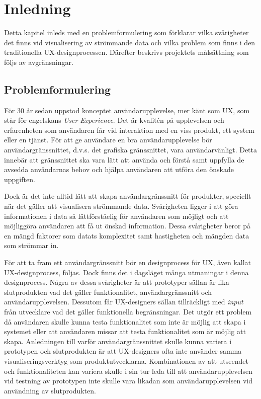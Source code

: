 \documentclass[12pt]{kththesis}
\begin{document}
\afterpage{\null\newpage}

\renewcommand{\contentsname}{Innehållsförteckning}

\tableofcontents


\mainmatter

\afterpage{\null}


\chapter{Inledning}
Detta kapitel inleds med en problemformulering som förklarar vilka svårigheter det finns vid visualisering av strömmande data och vilka problem som finns i den traditionella UX-designprocessen. Därefter beskrivs projektets målsättning som följs av avgränsningar.
\section{Problemformulering}
För 30 år sedan uppstod konceptet användarupplevelse, mer känt som UX, som står för engelskans \textit{User Experience}. Det är kvalitén på upplevelsen och erfarenheten som användaren får vid interaktion med en viss produkt, ett system eller en tjänst. För att ge användare en bra användarupplevelse bör användargränssnittet, d.v.s. det grafiska gränssnittet, vara användarvänligt. Detta innebär att gränssnittet ska vara lätt att använda och förstå samt uppfylla de avsedda användarnas behov och hjälpa användaren att utföra den önskade uppgiften. 

Dock är det inte alltid lätt att skapa användargränssnitt för produkter, speciellt när det gäller att visualisera strömmande data. Svårigheten ligger i att göra informationen i data så lättförståelig för användaren som möjligt och att möjliggöra användaren att få ut önskad information. Dessa svårigheter beror på en mängd faktorer som datats komplexitet samt hastigheten och mängden data som strömmar in. 

För att ta fram ett användargränssnitt bör en designprocess för UX, även kallat UX-designprocess, följas. Dock finns det i dagsläget många utmaningar i denna designprocess. Några av dessa svårigheter är att prototyper sällan är lika slutprodukten vad det gäller funktionalitet, användargränssnitt och användarupplevelsen. Dessutom får UX-designers sällan tillräckligt med \textit{input} från utvecklare vad det gäller funktionella begränsningar. Det utgör ett problem då användaren skulle kunna testa funktionalitet som inte är möjlig att skapa i systemet eller att användaren missar att testa funktionalitet som är möjlig att skapa. Anledningen till varför användargränssnittet skulle kunna variera i prototypen och slutprodukten är att UX-designers ofta inte använder samma visualiseringsverktyg som produktutvecklarna. Kombinationen av att utseendet och funktionaliteten kan variera skulle i sin tur leda till att användarupplevelsen vid testning av prototypen inte skulle vara likadan som användarupplevelsen vid användning av slutprodukten.  
\end{document}
